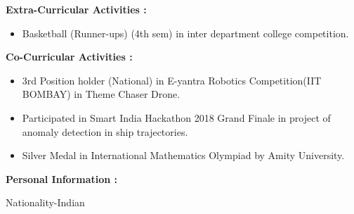\documentclass[11pt,a4paper]{article}
\begin{document}
\begin{multicols}{2}
	\begin{minipage}{0.15\paperwidth}
		\textbf{Extra-Curricular\linebreak
		Activities :}
	\end{minipage}
	\begin{minipage}{0.7\paperwidth}
		\begin{itemize}
			\item Basketball (Runner-ups) (4th sem) in inter department college competition.
		\end{itemize}
	\end{minipage}
\end{multicols}
\hfill
\begin{multicols}{2}
	\begin{minipage}{0.15\paperwidth}
		\textbf{Co-Curricular\linebreak
			Activities :}
	\end{minipage}
	\begin{minipage}{0.7\paperwidth}
		\begin{itemize}
			\item 3rd Position holder (National) in E-yantra Robotics Competition(IIT BOMBAY) in Theme Chaser Drone.
			\item Participated in Smart India Hackathon 2018 Grand Finale in project of anomaly detection in ship trajectories.
			\item Silver Medal in International Mathematics Olympiad by Amity University.
		\end{itemize}
	\end{minipage}
\end{multicols}
\hfill
\begin{multicols}{2}
	\begin{minipage}{0.17\paperwidth}
		\textbf{Personal\linebreak
		Information :}
	\end{minipage}
	\begin{minipage}{0.7\paperwidth}
		Nationality-Indian\linebreak
	\end{minipage}
\end{multicols}
\end{document}
